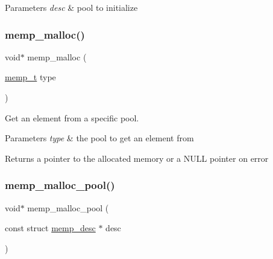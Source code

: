 \begin{DoxyParams}{Parameters}
{\em desc} & pool to initialize \\
\hline
\end{DoxyParams}
\mbox{\label{openmote-cc2538_2lwip_2src_2core_2memp_8c_a2b00593d086313c267b54a976bf67aa5}} 
\subsubsection{\texorpdfstring{memp\+\_\+malloc()}{memp\_malloc()}}
{\footnotesize\ttfamily void$\ast$ memp\+\_\+malloc (\begin{DoxyParamCaption}\item[{\hyperlink{native_2lwip_2src_2include_2lwip_2memp_8h_a85a164b1f7764951cc685ea525114e57}{memp\+\_\+t}}]{type }\end{DoxyParamCaption})}

Get an element from a specific pool.


\begin{DoxyParams}{Parameters}
{\em type} & the pool to get an element from\\
\hline
\end{DoxyParams}
\begin{DoxyReturn}{Returns}
a pointer to the allocated memory or a N\+U\+LL pointer on error 
\end{DoxyReturn}
\mbox{\label{openmote-cc2538_2lwip_2src_2core_2memp_8c_a348c83ee972f1edf7296a1cdf1d75f22}} 
\subsubsection{\texorpdfstring{memp\+\_\+malloc\+\_\+pool()}{memp\_malloc\_pool()}}
{\footnotesize\ttfamily void$\ast$ memp\+\_\+malloc\+\_\+pool (\begin{DoxyParamCaption}\item[{const struct \hyperlink{structmemp__desc}{memp\+\_\+desc} $\ast$}]{desc }\end{DoxyParamCaption})}

